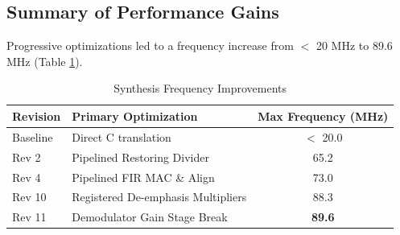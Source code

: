 \subsection{Summary of Performance Gains}
Progressive optimizations led to a frequency increase from $<$ 20 MHz to 89.6 MHz (Table \ref{tab:synthesis_history}).

\begin{table}[H]
    \centering
    \begin{tabular}{@{}llc@{}}
        \toprule
        Revision & Primary Optimization & Max Frequency (MHz) \\ \midrule
        Baseline & Direct C translation & $<$ 20.0 \\
        Rev 2 & Pipelined Restoring Divider & 65.2 \\
        Rev 4 & Pipelined FIR MAC \& Align & 73.0 \\
        Rev 10 & Registered De-emphasis Multipliers & 88.3 \\
        Rev 11 & Demodulator Gain Stage Break & \textbf{89.6} \\ \bottomrule
    \end{tabular}
    \caption{Synthesis Frequency Improvements}
    \label{tab:synthesis_history}
\end{table}

